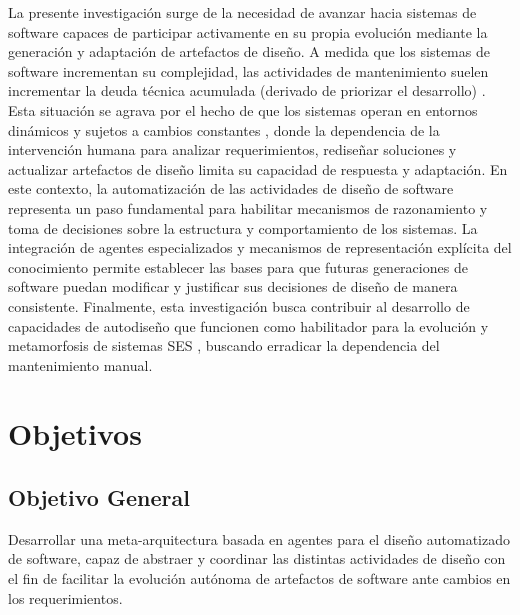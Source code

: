 \documentclass[12pt, letterpaper, oneside]{book}
\begin{document}
La presente investigación surge de la necesidad de avanzar hacia sistemas de software capaces de participar activamente en su propia evolución mediante la generación y adaptación de artefactos de diseño. A medida que los sistemas de software incrementan su complejidad, las actividades de mantenimiento suelen incrementar la deuda técnica acumulada (derivado de priorizar el desarrollo) \cite{thefinancial2015Areti}. Esta situación se agrava por el hecho de que los sistemas operan en entornos dinámicos y sujetos a cambios constantes \cite{runtimeCarwehl2023Runtime}, donde la dependencia de la intervención humana para analizar requerimientos, rediseñar soluciones y actualizar artefactos de diseño limita su capacidad de respuesta y adaptación. En este contexto, la automatización de las actividades de diseño de software representa un paso fundamental para habilitar mecanismos de razonamiento y toma de decisiones sobre la estructura y comportamiento de los sistemas. La integración de agentes especializados y mecanismos de representación explícita del conocimiento permite establecer las bases para que futuras generaciones de software puedan modificar y justificar sus decisiones de diseño de manera consistente. Finalmente, esta investigación busca contribuir al desarrollo de capacidades de autodiseño que funcionen como habilitador para la evolución y metamorfosis de sistemas SES \cite{perez2024}, buscando erradicar la dependencia del mantenimiento manual.

\section{Objetivos}

\subsection{Objetivo General}

Desarrollar una meta-arquitectura basada en agentes para el diseño automatizado de software, capaz de abstraer y coordinar las distintas actividades de diseño con el fin de facilitar la evolución autónoma de artefactos de software ante cambios en los requerimientos.
\end{document}
